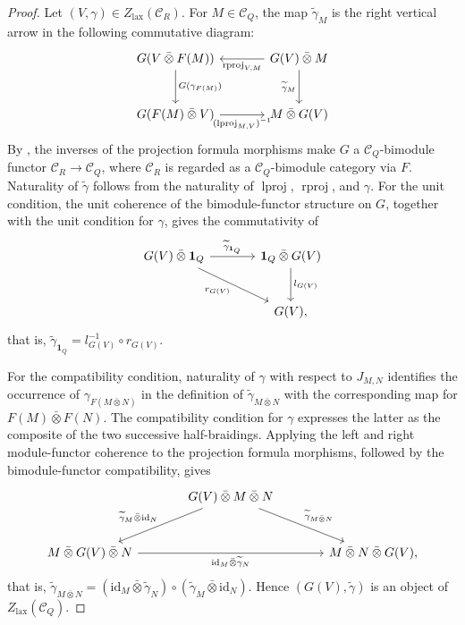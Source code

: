 \documentclass{amsart}
\newcommand{\id}{\mathrm{id}}
\DeclareMathOperator{\lproj}{lproj}
\DeclareMathOperator{\rproj}{rproj}
\newcommand{\btensor}{\mathbin{\bar{\otimes}}}
\theoremstyle{definition}
\theoremstyle{remark}
\numberwithin{equation}{section}
\begin{document}
\begin{proof}
Let $(V,\gamma)\in Z_{\mathrm{lax}}(\mathcal C_R)$.
For $M\in\mathcal C_Q$, the map $\widetilde\gamma_M$ is the
right vertical arrow in the following commutative diagram:
\begin{equation}\label{xxeq5-10}
\begin{tikzcd}[column sep=large,row sep=large]
G(V\btensor F(M))
  \arrow[d,"G(\gamma_{F(M)})"]
&
G(V)\btensor M
  \arrow[l,"\rproj_{V,M}"]
  \arrow[d,"\widetilde\gamma_M"']\\
G(F(M)\btensor V)
  \arrow[r,"(\lproj_{M,V})^{-1}"']
&
M\btensor G(V)
\end{tikzcd}
\end{equation}
By \cite[Proposition~3.22]{flake2026projection}, the
inverses of the projection formula morphisms make $G$ a
$\mathcal C_Q$-bimodule functor
$\mathcal C_R\to\mathcal C_Q$, where
$\mathcal C_R$ is regarded as a $\mathcal C_Q$-bimodule category via $F$.
Naturality of $\widetilde\gamma$ follows from the naturality of
$\lproj$, $\rproj$, and $\gamma$.
For the unit condition, the unit coherence of the bimodule-functor
structure on $G$, together with the unit condition for $\gamma$, gives
the commutativity of
\[
\begin{tikzcd}[column sep=large,row sep=large]
G(V)\btensor\mathbf1_Q
  \arrow[r,"\widetilde\gamma_{\mathbf1_Q}"]
  \arrow[dr,"r_{G(V)}"']
&
\mathbf1_Q\btensor G(V)
  \arrow[d,"l_{G(V)}"]\\
&
G(V),
\end{tikzcd}
\]
that is,
$\widetilde\gamma_{\mathbf1_Q}=l_{G(V)}^{-1}\circ r_{G(V)}$.

For the compatibility condition, naturality of $\gamma$ with respect to
$J_{M,N}$ identifies the occurrence of $\gamma_{F(M\btensor N)}$ in the
definition of $\widetilde\gamma_{M\btensor N}$ with the corresponding map for
$F(M)\btensor F(N)$.
The compatibility condition for $\gamma$ expresses the latter as the
composite of the two successive half-braidings.
Applying the left and right module-functor coherence to the projection
formula morphisms, followed by the bimodule-functor compatibility, gives
\[
\begin{tikzcd}[column sep=large,row sep=large]
&
G(V)\btensor M\btensor N
  \arrow[dl,"\widetilde\gamma_M\btensor\id_N"']
  \arrow[dr,"\widetilde\gamma_{M\btensor N}"]
&\\
M\btensor G(V)\btensor N
  \arrow[rr,"\id_M\btensor\widetilde\gamma_N"']
& &
M\btensor N\btensor G(V),
\end{tikzcd}
\]
that is,
$\widetilde\gamma_{M\btensor N}
=(\id_M\btensor\widetilde\gamma_N)
\circ(\widetilde\gamma_M\btensor\id_N)$.
Hence $(G(V),\widetilde\gamma)$ is an object of
$Z_{\mathrm{lax}}(\mathcal C_Q)$.


\end{proof}
\end{document}
